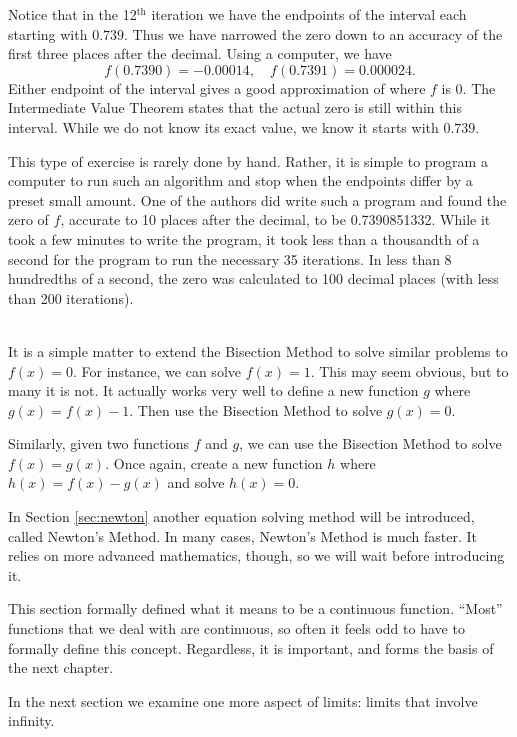 {Notice that in the 12$^\text{th}$ iteration we have the endpoints of the interval each starting with $0.739$. Thus we have narrowed the zero down to an accuracy of the first three places after the decimal. Using a computer, we have 
$$ f(0.7390) = -0.00014, \quad f(0.7391) = 0.000024.$$ Either endpoint of the interval gives a good approximation of where $f$ is 0. The Intermediate Value Theorem states that the actual zero is still within this interval. While we do not know its exact value, we know it starts with $0.739$. 

This type of exercise is rarely done by hand. Rather, it is simple to program a computer to run such an algorithm and stop when the endpoints differ by a preset small amount. One of the authors did write such a program and found the zero of $f$, accurate to 10 places after the decimal, to be 0.7390851332. While it took a few minutes to write the program, it took less than a thousandth of a second for the program to run the necessary 35 iterations. In less than 8 hundredths of a second, the zero was calculated to 100 decimal places (with less than 200 iterations).
}\\

It is a simple matter to extend the Bisection Method to solve similar problems to $f(x) = 0$. For instance, we can solve $f(x) = 1$. This may seem obvious, but to many it is not. It actually works very well to define a new function $g$ where $g(x) = f(x) - 1$. Then use the Bisection Method to solve $g(x)=0$.  

Similarly, given two functions $f$ and $g$, we can use the Bisection Method to solve $f(x) = g(x)$. Once again, create a new function $h$ where $h(x) = f(x)-g(x)$ and solve $h(x) = 0$. 

In Section \ref{sec:newton} another equation solving method will be introduced, called Newton's Method. In many cases, Newton's Method is much faster. It relies on more advanced mathematics, though, so we will wait before introducing it. 

This section formally defined what it means to be a continuous function. ``Most'' functions that we deal with are continuous, so often it feels odd to have to formally define this concept. Regardless, it is important, and forms the basis of the next chapter.
\enlargethispage{\baselineskip}

In the next section we examine one more aspect of limits: limits that involve infinity.
		
